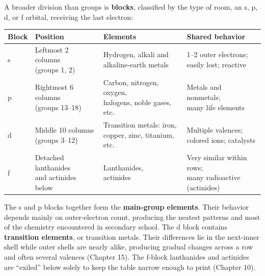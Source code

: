 A broader division than groups is \textbf{blocks}, classified by the type of room, an s, p, d, or f orbital, receiving the last electron:

\begin{table}[htbp]
\centering
\begin{tabular}{llll}
\toprule
Block & Position & Elements & Shared behavior \\
\midrule
s & \shortstack[l]{Leftmost 2 columns\\(groups 1, 2)} & \shortstack[l]{Hydrogen, alkali and\\alkaline-earth metals} & \shortstack[l]{1--2 outer electrons;\\easily lost; reactive} \\
p & \shortstack[l]{Rightmost 6 columns\\(groups 13--18)} & \shortstack[l]{Carbon, nitrogen, oxygen,\\halogens, noble gases, etc.} & \shortstack[l]{Metals and nonmetals;\\many life elements} \\
d & \shortstack[l]{Middle 10 columns\\(groups 3--12)} & \shortstack[l]{Transition metals: iron,\\copper, zinc, titanium, etc.} & \shortstack[l]{Multiple valences;\\colored ions; catalysts} \\
f & \shortstack[l]{Detached lanthanides\\and actinides below} & \shortstack[l]{Lanthanides,\\actinides} & \shortstack[l]{Very similar within rows;\\many radioactive\\(actinides)} \\
\bottomrule
\end{tabular}
\end{table}

The s and p blocks together form the \textbf{main-group elements}. Their behavior depends mainly on outer-electron count, producing the neatest patterns and most of the chemistry encountered in secondary school. The d block contains \textbf{transition elements}, or transition metals. Their differences lie in the next-inner shell while outer shells are nearly alike, producing gradual changes across a row and often several valences (Chapter 15). The f-block lanthanides and actinides are ``exiled'' below solely to keep the table narrow enough to print (Chapter 10).

